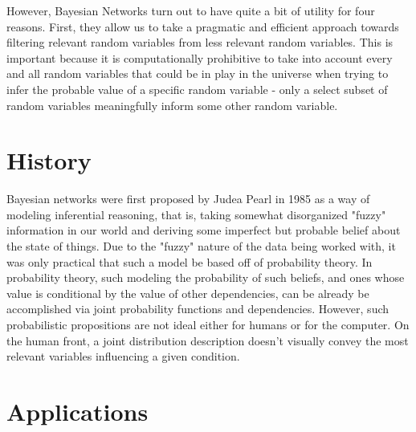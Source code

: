 \documentclass[a4paper,12pt]{article}
\begin{document}
However, Bayesian Networks turn out to have quite a bit of utility for four reasons\cite{Heckerman08}. First, they allow us to take a pragmatic and efficient approach towards filtering relevant random variables from less relevant random variables. This is important because it is computationally prohibitive to take into account every and all random variables that could be in play in the universe when trying to infer the probable value of a specific random variable - only a select subset of random variables meaningfully inform some other random variable.

\section{History}

Bayesian networks were first proposed by Judea Pearl\cite{pearl85} in 1985 as a way of modeling inferential reasoning, that is, taking somewhat disorganized "fuzzy" information in our world and deriving some imperfect but probable belief about the state of things. Due to the "fuzzy" nature of the data being worked with, it was only practical that such a model be based off of probability theory. In probability theory, such modeling the probability of such beliefs, and ones whose value is conditional by the value of other dependencies, can be already be accomplished via joint probability functions and dependencies. However, such probabilistic propositions are not ideal either for humans or for the computer. On the human front, a joint distribution description doesn't visually convey the most relevant variables influencing a given condition. 

\cite{murphy02}

\section{Applications}



\end{document}
